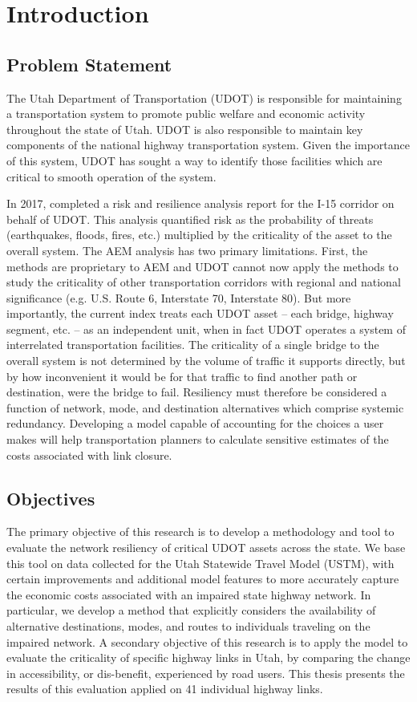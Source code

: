 \chapter{Introduction}
\label{chp:chapter1}
\graphicspath{{figures/}{figures/chapter1/}}

\section{Problem Statement}
The Utah Department of Transportation (UDOT) is responsible for maintaining a
transportation system to promote public welfare and economic activity throughout
the state of Utah. UDOT is also responsible to maintain key components of the
national highway transportation system. Given the importance of this system,
UDOT has sought a way to identify those facilities which are critical to smooth
operation of the system.

In 2017, \citet{aem2017} completed a risk and resilience analysis report for the I-15 corridor on behalf of
UDOT. This analysis quantified risk as the probability of threats (earthquakes, floods, fires,
etc.) multiplied by the criticality of the asset to the overall system. The AEM
analysis has two primary limitations. First, the methods are proprietary to
AEM and UDOT cannot now apply the methods to study the criticality of other transportation
corridors with regional and national significance (e.g. U.S. Route 6, Interstate 70, Interstate 80). But more
importantly, the current index treats each UDOT asset – each bridge, highway segment, etc. – as an
independent unit, when in fact UDOT operates a system of interrelated transportation facilities. The criticality
of a single bridge to the overall system is not determined by the volume of traffic it supports
directly, but by how inconvenient it would be for that traffic to find another path or destination,
were the bridge to fail. Resiliency must therefore be considered a function of network, mode, and destination
alternatives which comprise systemic redundancy. Developing a model capable of accounting for the choices a user makes will help
transportation planners to calculate sensitive estimates of the costs associated with link closure.

\section{Objectives}
The primary objective of this research is to develop a methodology and tool to evaluate the
network resiliency of critical UDOT assets across the state. We base this tool on data collected
for the Utah Statewide Travel Model (USTM), with certain improvements and additional model
features to more accurately capture the economic costs associated with an impaired state highway
network. In particular, we develop a method that explicitly considers the availability of
alternative destinations, modes, and routes to individuals traveling on the impaired network. A
secondary objective of this research is to apply the model to evaluate the criticality of
specific
highway links in Utah, by comparing the change in accessibility, or dis-benefit,
experienced by road users.
This thesis presents the results of this evaluation applied
on 41 individual highway links.

